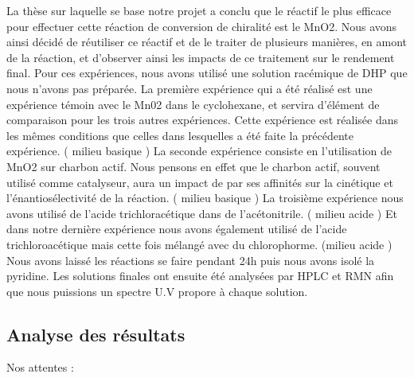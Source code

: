 \documentclass{article}
\begin{document}
La thèse sur laquelle se base notre projet a conclu que le réactif le plus efficace pour effectuer cette réaction de conversion de chiralité est le MnO2. Nous avons ainsi décidé de réutiliser ce réactif et de le traiter de plusieurs manières, en amont de la réaction, et d’observer ainsi les impacts de ce traitement sur le rendement final.
Pour ces expériences, nous avons utilisé une solution racémique de DHP que nous n’avons pas préparée.
\medbreak
La première expérience qui a été réalisé est une expérience témoin avec le Mn02 dans le cyclohexane, et servira d’élément de comparaison pour les trois autres expériences. Cette expérience est réalisée dans les mêmes conditions que celles dans lesquelles a été faite la précédente expérience. ( milieu basique )
 \medbreak
La seconde expérience consiste en l’utilisation de MnO2 sur charbon actif. Nous pensons en effet que le charbon actif, souvent utilisé comme catalyseur, aura un impact de par ses affinités sur la cinétique et l'énantiosélectivité de la réaction. ( milieu basique )
\medbreak
La troisième expérience nous avons utilisé de l’acide trichloracétique dans de l’acétonitrile. ( milieu acide )
Et dans notre dernière expérience nous avons également utilisé de l’acide trichloroacétique mais cette fois mélangé avec du chlorophorme. (milieu acide )
\medbreak
Nous avons laissé les réactions se faire pendant 24h puis nous avons isolé la pyridine.
Les solutions finales ont ensuite été analysées par HPLC et RMN afin que nous puissions un spectre U.V propore à chaque solution.


\subsection{Analyse des résultats}


























Nos attentes :
\end{document}
